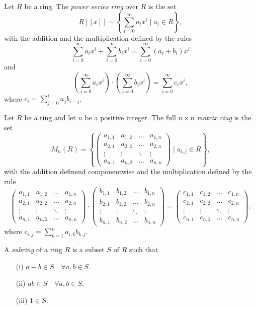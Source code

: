 \begin{example}
	Let $R$ be a ring. The {\em power series ring} over $R$ is the set
	$$R[[x]]=\left\{ \sum_{i=0}^{\infty}a_ix^{i}\mid a_{i}\in R\right\},
	$$
	with the addition and the multiplication defined by the rules
	$$\sum_{i=0}^{\infty}a_ix^{i} +\sum_{i=0}^{\infty}b_ix^{i}=\sum_{i=0}^{\infty}(a_i+b_i)x^{i}$$
	and
	$$\left(\sum_{i=0}^{\infty}a_ix^{i}\right)\cdot\left( \sum_{i=0}^{\infty}b_ix^{i}\right)=\sum_{i=0}^{\infty}c_ix^{i},$$
	where $c_i=\sum_{j=0}^{i}a_jb_{i-j}$.
\end{example}
	
\begin{example}	
Let $R$ be a ring and let $n$ be a positive integer. The full $n\times n$ {\em matrix ring} is the set
$$M_n(R)=\left\{\left(\begin{array}{cccc}
	a_{1,1}&a_{1,2}&\ldots&a_{1,n}\\
	a_{2,1}&a_{2,2}&\ldots&a_{2,n}\\
	\vdots&\vdots&\ddots&\vdots\\
	a_{n,1}&a_{n,2}&\ldots&a_{n,n}
	\end{array}\right)\mid a_{i,j}\in R\right\},$$
with the addition definend componentwise and the multiplication defined by the rule
$$\left(\begin{array}{cccc}
	a_{1,1}&a_{1,2}&\ldots&a_{1,n}\\
	a_{2,1}&a_{2,2}&\ldots&a_{2,n}\\
	\vdots&\vdots&\ddots&\vdots\\
	a_{n,1}&a_{n,2}&\ldots&a_{n,n}
\end{array}\right)\cdot\left(\begin{array}{cccc}
b_{1,1}&b_{1,2}&\ldots&b_{1,n}\\
b_{2,1}&b_{2,2}&\ldots&b_{2,n}\\
\vdots&\vdots&\ddots&\vdots\\
b_{n,1}&b_{n,2}&\ldots&b_{n,n}
\end{array}\right)=\left(\begin{array}{cccc}
	c_{1,1}&c_{1,2}&\ldots&c_{1,n}\\
	c_{2,1}&c_{2,2}&\ldots&c_{2,n}\\
	\vdots&\vdots&\ddots&\vdots\\
	c_{n,1}&c_{n,2}&\ldots&c_{n,n}
\end{array}\right),$$
where $c_{i,j}=\sum_{k=1}^na_{i,k}b_{k,j}$.
\end{example}

A {\em subring} of a ring $R$ is a subset $S$ of $R$ such that
\begin{itemize}
\item[(i)] $a-b\in S\quad\forall a,b\in S$.
\item[(ii)] $ab\in S\quad\forall a,b\in S$.
\item[(iii)] $1\in S$.
\end{itemize}

